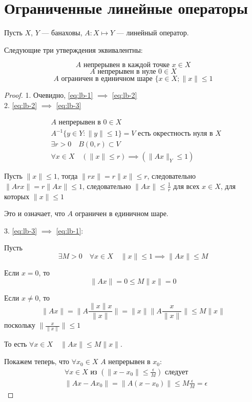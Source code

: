 \section{Ограниченные линейные операторы}

Пусть $X$, $Y$ --- банаховы,
$A : X \mapsto Y$ --- линейный оператор.

\begin{thm}
\label{th:l-b-def-equiv}
Следующие три утверждения эквивалентны:

\begin{equation} \label{eq:lb-1}
  A \text{ непрерывен в каждой точке } x\in X \end{equation}
\begin{equation} \label{eq:lb-2}
  A \text{ непрерывен в нуле } 0\in X \end{equation}
\begin{equation} \label{eq:lb-3}
  A \text{ ограничен в единичном шаре } \{x\in X ; \|x\|\leq 1\end{equation}
\end{thm}
\begin{proof}

1. Очевидно, \eqref{eq:lb-1} $\implies$ \eqref{eq:lb-2} \\

2. \eqref{eq:lb-2} $\implies$ \eqref{eq:lb-3} 

\begin{align*}
& A \text{ непрерывен в } 0\in X \\
& A^{-1}\{y\in Y: \|y\|\leq 1\} = V\text{ есть окрестность нуля в } X \\
& \exists r>0 \quad B(0, r)\subset V \\
& \forall x\in X \quad (\|x\| \leq r) \implies (\|A x\|_Y \leq 1)
\end{align*}

Пусть $\|x\|\leq 1$, тогда $\|rx\| = r\|x\| \leq r$,
следовательно ${\|A rx\| = r \|A x\| \leq 1}$,
следовательно ${\|A x\| \leq \frac{1}{r}}$ для всех $x\in X$, для которых $\|x\|\leq 1$

Это и означает, что $A$ ограничен в единичном шаре.

3. \eqref{eq:lb-3} $\implies$ \eqref{eq:lb-1}:

Пусть
 $$\exists M>0 \quad \forall x\in X \quad \|x\|\leq 1 \implies \|A x\| \leq M$$

Если $x=0$, то $$\|A x\| = 0 \leq M\|x\| = 0$$

Если $x\neq 0$, то
$$\|A x\| = \|A \frac{\|x\|x}{\|x\|}\| = \|x\| \|A \frac{x}{\|x\|}\| \leq M \|x\|$$
поскольку  $\|\frac{x}{\|x\|}\|\leq 1$

То есть $\forall x\in X \quad \|A x\| \leq M \|x\|$.

Покажем теперь, что $\forall x_0\in X$ $A$ непрерывен в $x_0$:
\begin{align*}
& \forall x\in X \text{ из } (\|x - x_0\| \leq \frac{\epsilon}{M}) \text{ следует } \\
& \|A x - A x_0\| = \|A (x - x_0)\| \leq M \frac{\epsilon}{M} = \epsilon
\end{align*}

\end{proof}

